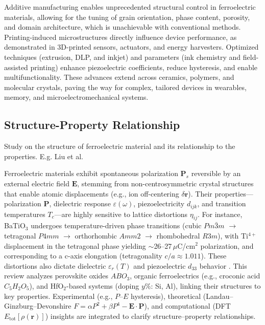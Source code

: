 \documentclass[a4paper,fleqn]{cas-sc}
\begin{document}
\par Additive manufacturing enables unprecedented structural control in ferroelectric materials, allowing for the tuning of grain orientation, phase content, porosity, and domain architecture, which is unachievable with conventional methods. Printing-induced microstructures directly influence device performance, as demonstrated in 3D-printed sensors, actuators, and energy harvesters. Optimized techniques (extrusion, DLP, and inkjet) and parameters (ink chemistry and field-assisted printing) enhance piezoelectric coefficients, reduce hysteresis, and enable multifunctionality. These advances extend across ceramics, polymers, and molecular crystals, paving the way for complex, tailored devices in wearables, memory, and microelectromechanical systems.

\subsection{Structure-Property Relationship} \label{SP}
Study on the structure of ferroelectric material and its relationship to the properties. E.g. Liu et al. ~\cite{Liu2022-NMI}
\par Ferroelectric materials exhibit spontaneous polarization \( \mathbf{P}_s \) reversible by an external electric field \( \mathbf{E} \), stemming from non-centrosymmetric crystal structures that enable atomic displacements (e.g., ion off-centering \( \delta\mathbf{r} \)). Their properties—polarization \( \mathbf{P} \), dielectric response \( \varepsilon(\omega) \), piezoelectricity \( d_{ijk} \), and transition temperatures \( T_c \)—are highly sensitive to lattice distortions \( \eta_{ij} \). For instance, BaTiO\(_3\) undergoes temperature-driven phase transitions (cubic \( Pm\bar{3}m \) \(\rightarrow\) tetragonal \( P4mm \) \(\rightarrow\) orthorhombic \( Amm2 \) \(\rightarrow\) rhombohedral \( R3m \)), with Ti\(^{4+}\) displacement in the tetragonal phase yielding \( \sim\!\)26–27\,\(\mu\)C/cm\(^2\) polarization, and corresponding to a c-axis elongation (tetragonality \( c/a \approx 1.011 \)). These distortions also dictate dielectric \( \varepsilon_r(T) \) and piezoelectric \( d_{33} \) behavior \cite{aslla2021role}. This review analyzes perovskite oxides \( ABO_3 \), organic ferroelectrics (e.g., croconic acid \( C_5H_2O_5 \)), and HfO\(_2\)-based systems (doping \( y\% \): Si, Al), linking their structures to key properties. Experimental (e.g., \( P \)–\( E \) hysteresis), theoretical (Landau–Ginzburg–Devonshire \( F = \alpha P^2 + \beta P^4 - \mathbf{E}\cdot\mathbf{P} \)), and computational (DFT \( E_{\text{tot}}[\rho(\mathbf{r})] \)) insights are integrated to clarify structure–property relationships.
\end{document}
